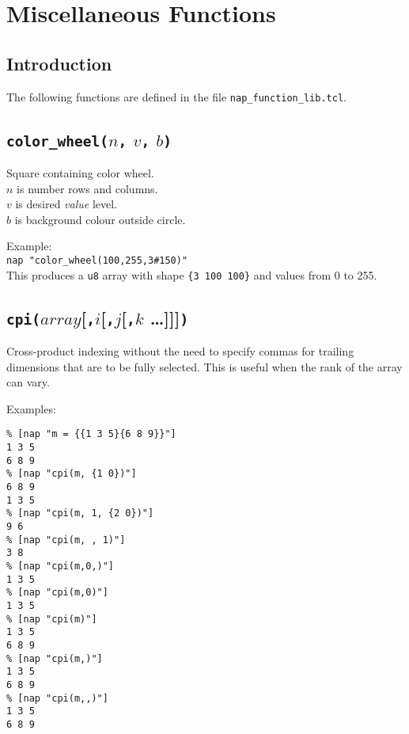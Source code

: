 
\section{Miscellaneous Functions}
    \label{nap-function-lib}

\subsection{Introduction}
    \label{nap-function-lib-Introduction}

The following functions are defined in the file 
  \texttt{nap\_function\_lib.tcl}.

\subsection{\texttt{color\_wheel(}$n$\texttt{,} $v$\texttt{,} $b$\texttt{)}}
    \label{nap-function-lib-color-wheel}

Square containing color wheel.
\\
$n$ is number rows and columns.
\\
$v$ is desired \emph{value} level.
\\
$b$ is background colour outside circle.

Example:
\\
\texttt{nap "color\_wheel(100,255,3\#150)"}
\\
This produces a 
\texttt{u8} array with shape 
\texttt{\{3 100 100\}} and values from 0 to 255.

\subsection{\texttt{cpi(}$\mathit{array}$[\texttt{,}$i$[\texttt{,}$j$[\texttt{,}$k$ \ldots ]]]\texttt{)}}
    \label{nap-function-lib-cpi}

Cross-product indexing without the need to specify commas for trailing
dimensions that are to be fully selected.
This is useful when the rank of the array can vary.

Examples:
\begin{verbatim}
% [nap "m = {{1 3 5}{6 8 9}}"]
1 3 5
6 8 9
% [nap "cpi(m, {1 0})"]
6 8 9
1 3 5
% [nap "cpi(m, 1, {2 0})"]
9 6
% [nap "cpi(m, , 1)"]
3 8
% [nap "cpi(m,0,)"]
1 3 5
% [nap "cpi(m,0)"]
1 3 5
% [nap "cpi(m)"]
1 3 5
6 8 9
% [nap "cpi(m,)"]
1 3 5
6 8 9
% [nap "cpi(m,,)"]
1 3 5
6 8 9
\end{verbatim}

